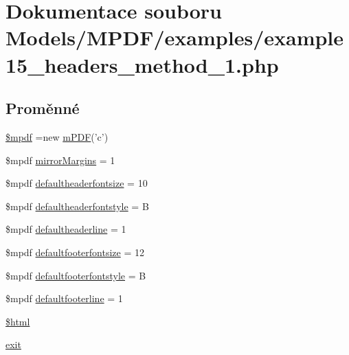 \hypertarget{example15__headers__method__1_8php}{\section{Dokumentace souboru Models/\-M\-P\-D\-F/examples/example15\-\_\-headers\-\_\-method\-\_\-1.php}
\label{example15__headers__method__1_8php}
}
\subsection*{Proměnné}
\begin{DoxyCompactItemize}
\item 
\hyperlink{example15__headers__method__1_8php_ad028f81910d6cbab9b184d2214b3a8f8}{\$mpdf} =new \hyperlink{classm_p_d_f}{m\-P\-D\-F}('c')
\item 
\$mpdf \hyperlink{example15__headers__method__1_8php_a24c284cb7774410f65953584ea1fd9c1}{mirror\-Margins} = 1
\item 
\$mpdf \hyperlink{example15__headers__method__1_8php_a4c43cebc1c86e1ef09a48264604a6fb2}{defaultheaderfontsize} = 10
\item 
\$mpdf \hyperlink{example15__headers__method__1_8php_ac532ed43fd458154e30602256ee55dff}{defaultheaderfontstyle} = B
\item 
\$mpdf \hyperlink{example15__headers__method__1_8php_a0f8da5f23ed7fc3ef960ec17f0517776}{defaultheaderline} = 1
\item 
\$mpdf \hyperlink{example15__headers__method__1_8php_af908f917e35d865734d31eecf6841116}{defaultfooterfontsize} = 12
\item 
\$mpdf \hyperlink{example15__headers__method__1_8php_a6a30e6faeafbd33aa10828e7898a54ec}{defaultfooterfontstyle} = B
\item 
\$mpdf \hyperlink{example15__headers__method__1_8php_aeb1097aa7f38066f868a9c71ded9e510}{defaultfooterline} = 1
\item 
\hyperlink{example15__headers__method__1_8php_a6f96e7fc92441776c9d1cd3386663b40}{\$html}
\item 
\hyperlink{example15__headers__method__1_8php_a6733eb5f605d09eaede9845835d71c4e}{exit}
\end{DoxyCompactItemize}


